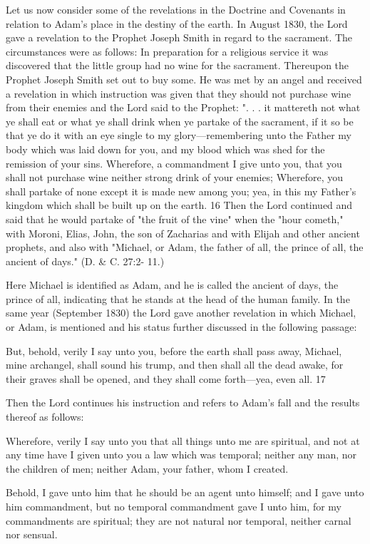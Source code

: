 Let us now consider some of the revelations in the Doctrine and Covenants in relation to
Adam's place in the destiny of the earth. In August 1830, the Lord gave a revelation to the
Prophet Joseph Smith in regard to the sacrament. The circumstances were as follows: In
preparation for a religious service it was discovered that the little group had no wine for the
sacrament. Thereupon the Prophet Joseph Smith set out to buy some. He was met by an angel
and received a revelation in which instruction was given that they should not purchase wine
from their enemies and the Lord said to the Prophet: ". . . it mattereth not what ye shall eat or
what ye shall drink when ye partake of the sacrament, if it so be that ye do it with an eye
single to my glory—remembering unto the Father my body which was laid down for you,
and my blood which was shed for the remission of your sins. Wherefore, a commandment I
give unto you, that you shall not purchase wine neither strong drink of your enemies;
Wherefore, you shall partake of none except it is made new among you; yea, in this my
Father's kingdom which shall be built up on the earth. 16 Then the Lord continued and said
that he would partake of "the fruit of the vine" when the "hour cometh," with Moroni, Elias,
John, the son of Zacharias and with Elijah and other ancient prophets, and also with
"Michael, or Adam, the father of all, the prince of all, the ancient of days." (D. \& C. 27:2-
11.)

Here Michael is identified as Adam, and he is called the ancient of days, the prince of all,
indicating that he stands at the head of the human family. In the same year (September 1830)
the Lord gave another revelation in which Michael, or Adam, is mentioned and his status
further discussed in the following passage:

But, behold, verily I say unto you, before the earth shall pass away, Michael, mine archangel,
shall sound his trump, and then shall all the dead awake, for their graves shall be opened, and
they shall come forth—yea, even all. 17

Then the Lord continues his instruction and refers to Adam's fall and the results thereof as
follows:

Wherefore, verily I say unto you that all things unto me are spiritual, and not at any time
have I given unto you a law which was temporal; neither any man, nor the children of men;
neither Adam, your father, whom I created.

Behold, I gave unto him that he should be an agent unto himself; and I gave unto him
commandment, but no temporal commandment gave I unto him, for my commandments are
spiritual; they are not natural nor temporal, neither carnal nor sensual.

